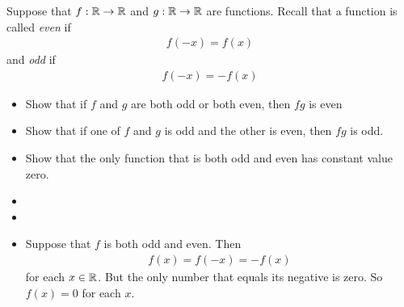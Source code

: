 \documentclass[11pt]{article}
\begin{document}
\begin{exercise}
    Suppose that $f : \mathbb{R} \rightarrow \mathbb{R}$ and $g : \mathbb{R} \rightarrow \mathbb{R}$ are functions. 
    Recall that a function is called \textit{even} if 
    \begin{align*}
        f(-x) = f(x)
    \end{align*}
    and \textit{odd} if 
    \begin{align*}
        f(-x) = - f(x)
    \end{align*}
    \begin{itemize}
     \item Show that if $f$ and $g$ are both odd or both even, then $fg$ is even 
     \item Show that if one of $f$ and $g$ is odd and the other is even, then $fg$ is odd.
     \item Show that the only function that is both odd and even has constant value zero. 
    \end{itemize}
\end{exercise}
\begin{solution}
    \begin{itemize}
     \item 
     \item 
     \item Suppose that $f$ is both odd and even. Then 
     \begin{align*}
        f(x) = f(-x) = -f(x)
     \end{align*}
     for each $x \in \mathbb{R}$. But the only number that equals its negative is zero. So $f(x) = 0$ for each $x$.
    \end{itemize}
\end{solution}
\end{document}
